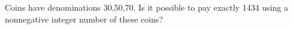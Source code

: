 Coins have denominations 30,50,70. Is it possible to pay exactly 1434 using a nonnegative integer number of these coins?
